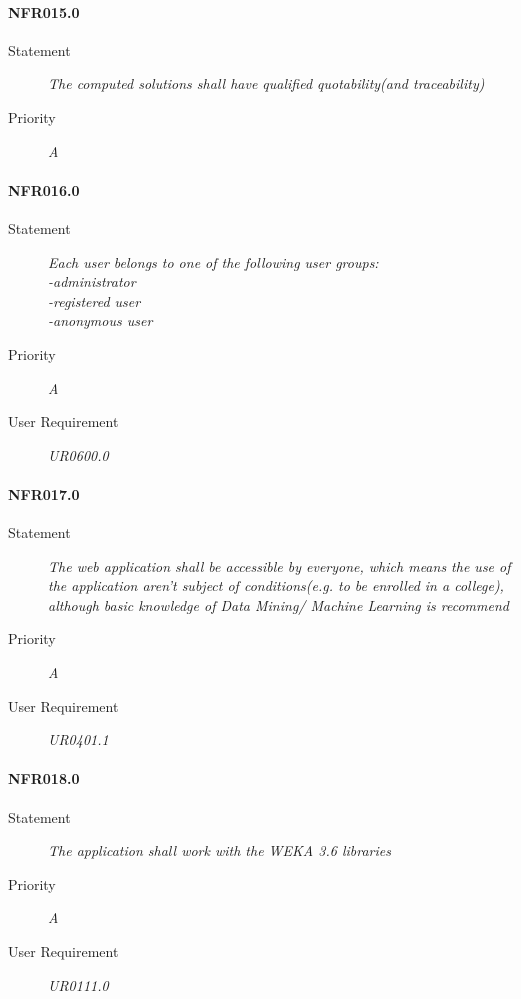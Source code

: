 \paragraph{NFR015.0}
\begin{description}
\item [Statement] \textit{
The computed solutions shall have qualified quotability(and traceability)
}
\item [Priority] \textit{A}
\end{description}

\paragraph{NFR016.0}
\begin{description}
\item [Statement] \textit{
Each user belongs to one of the following user groups:
	\\-\gls{administrator}
	\\-registered user
	\\-\gls{anonymous user}
}
\item [Priority] \textit{A}
\item[User Requirement] \textit{UR0600.0}
\end{description}

\paragraph{NFR017.0}
\begin{description}
\item [Statement] \textit{
The web application shall be accessible by everyone, which means the use of the application aren’t subject of conditions(e.g. to be enrolled in a college), although basic knowledge of Data Mining/ Machine Learning is recommend
}
\item [Priority] \textit{A}
\item[User Requirement] \textit{UR0401.1}
\end{description}

\paragraph{NFR018.0}
\begin{description}
\item [Statement] \textit{
The application shall work with the \gls{WEKA} 3.6 libraries
}
\item [Priority] \textit{A}
\item[User Requirement] \textit{UR0111.0}
\end{description}

